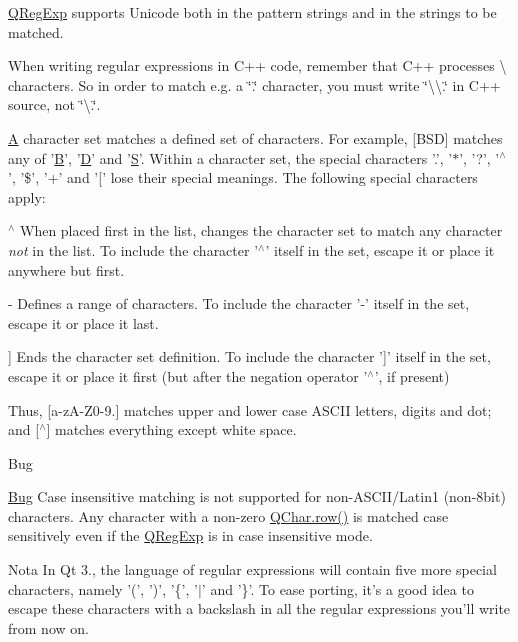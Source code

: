 \hyperlink{class_q_reg_exp}{Q\-Reg\-Exp} supports Unicode both in the pattern strings and in the strings to be matched.

When writing regular expressions in C++ code, remember that C++ processes \textbackslash{} characters. So in order to match e.\-g. a \char`\"{}.\char`\"{} character, you must write \char`\"{}\textbackslash{}\textbackslash{}.\char`\"{} in C++ source, not \char`\"{}\textbackslash{}.\char`\"{}.

\hyperlink{class_a}{A} character set matches a defined set of characters. For example, \mbox{[}B\-S\-D\mbox{]} matches any of '\hyperlink{class_b}{B}', '\hyperlink{class_d}{D}' and '\hyperlink{struct_s}{S}'. Within a character set, the special characters '.', '$\ast$', '?', '$^\wedge$', '\$', '+' and '\mbox{[}' lose their special meanings. The following special characters apply\-: 
\begin{DoxyItemize}
\item {\ttfamily $^\wedge$} When placed first in the list, changes the character set to match any character {\itshape not} in the list. To include the character '$^\wedge$' itself in the set, escape it or place it anywhere but first. 
\item {\ttfamily -\/} Defines a range of characters. To include the character '-\/' itself in the set, escape it or place it last. 
\item {\ttfamily \mbox{]}} Ends the character set definition. To include the character '\mbox{]}' itself in the set, escape it or place it first (but after the negation operator '$^\wedge$', if present) 
\end{DoxyItemize}Thus, \mbox{[}a-\/z\-A-\/\-Z0-\/9.\mbox{]} matches upper and lower case A\-S\-C\-I\-I letters, digits and dot; and \mbox{[}$^\wedge$\mbox{]} matches everything except white space.

\begin{DoxyRefDesc}{Bug}
\item[\hyperlink{bug__bug000003}{Bug}]Case insensitive matching is not supported for non-\/\-A\-S\-C\-I\-I/\-Latin1 (non-\/8bit) characters. Any character with a non-\/zero \hyperlink{class_q_char_aa0362ae052f9a76a268e0d23859a62f5}{Q\-Char.\-row()} is matched case sensitively even if the \hyperlink{class_q_reg_exp}{Q\-Reg\-Exp} is in case insensitive mode.\end{DoxyRefDesc}


\begin{DoxyNote}{Nota}
In Qt 3., the language of regular expressions will contain five more special characters, namely '(', ')', '\{', '$|$' and '\}'. To ease porting, it's a good idea to escape these characters with a backslash in all the regular expressions you'll write from now on. 
\end{DoxyNote}


